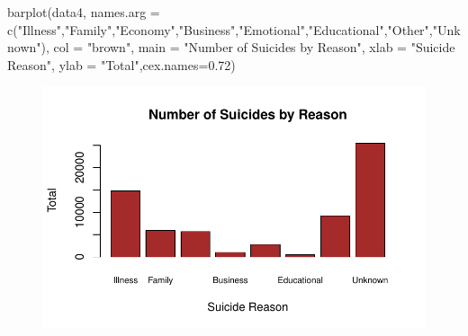 \documentclass[
  11pt,
  a4paper,
  DIV=11,
  numbers=noendperiod]{scrartcl}
\newenvironment{Shaded}{\begin{snugshade}}{\end{snugshade}}
\newcommand{\AttributeTok}[1]{\textcolor[rgb]{0.40,0.45,0.13}{#1}}
\newcommand{\FloatTok}[1]{\textcolor[rgb]{0.68,0.00,0.00}{#1}}
\newcommand{\FunctionTok}[1]{\textcolor[rgb]{0.28,0.35,0.67}{#1}}
\newcommand{\NormalTok}[1]{\textcolor[rgb]{0.00,0.23,0.31}{#1}}
\newcommand{\StringTok}[1]{\textcolor[rgb]{0.13,0.47,0.30}{#1}}
\begin{document}
\begin{Shaded}
\begin{Highlighting}[]
\FunctionTok{barplot}\NormalTok{(data4, }\AttributeTok{names.arg =} \FunctionTok{c}\NormalTok{(}\StringTok{"Illness"}\NormalTok{,}\StringTok{"Family"}\NormalTok{,}\StringTok{"Economy"}\NormalTok{,}\StringTok{"Business"}\NormalTok{,}\StringTok{"Emotional"}\NormalTok{,}\StringTok{"Educational"}\NormalTok{,}\StringTok{"Other"}\NormalTok{,}\StringTok{"Unknown"}\NormalTok{), }\AttributeTok{col =} \StringTok{"brown"}\NormalTok{, }\AttributeTok{main =} \StringTok{"Number of Suicides by Reason"}\NormalTok{, }\AttributeTok{xlab =} \StringTok{"Suicide Reason"}\NormalTok{, }\AttributeTok{ylab =} \StringTok{"Total"}\NormalTok{,}\AttributeTok{cex.names=}\FloatTok{0.72}\NormalTok{)}
\end{Highlighting}
\end{Shaded}

\begin{figure}[H]

{\centering \includegraphics{analysis_files/figure-pdf/unnamed-chunk-9-1.pdf}

}

\end{figure}
\end{document}
